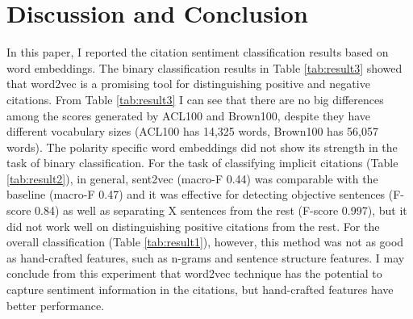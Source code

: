 \documentclass[11pt]{llncs}
\begin{document}
\section{Discussion and Conclusion}
\label{sec:discon}
In this paper, I reported the citation sentiment classification results based on word embeddings. The binary classification results in Table \ref{tab:result3} showed that word2vec is a promising tool for distinguishing positive and negative citations. From Table \ref{tab:result3} I can see that there are no big differences among the scores generated by ACL100 and Brown100, despite they have different vocabulary sizes (ACL100 has 14,325 words, Brown100 has 56,057 words). The polarity specific word embeddings did not show its strength in the task of binary classification. For the task of classifying implicit citations (Table \ref{tab:result2}), in general, sent2vec (macro-F 0.44) was comparable with the baseline (macro-F 0.47) and it was effective for detecting objective sentences (F-score 0.84) as well as separating X sentences from the rest (F-score 0.997), but it did not work well on distinguishing positive citations from the rest. For the overall classification (Table \ref{tab:result1}), however, this method was not as good as hand-crafted features, such as n-grams and sentence structure features. I may conclude from this experiment that word2vec technique has the potential to capture sentiment information in the citations, but hand-crafted features have better performance.
\end{document}
